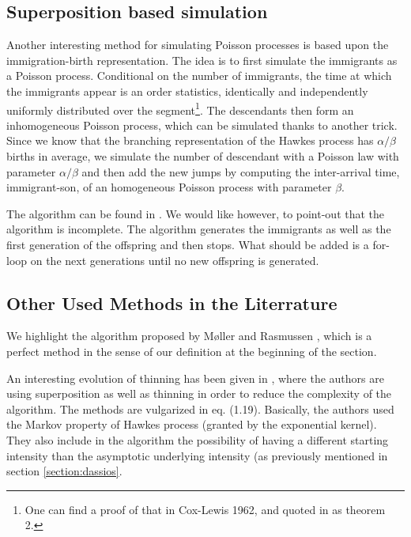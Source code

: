 \subsection{Superposition based simulation}
Another interesting method for simulating Poisson processes is based upon the immigration-birth representation. The idea is to first simulate the immigrants as a Poisson process. Conditional on the number of immigrants, the time at which the immigrants appear is an order statistics, identically and independently uniformly distributed over the segment\footnote{One can find a proof of that in Cox-Lewis 1962, and quoted in \cite{gen_nonhomo_poisson} as theorem 2.}. The descendants then form an inhomogeneous Poisson process, which can be simulated thanks to another trick. Since we know that the branching representation of the Hawkes process has $\alpha / \beta $ births in average, we simulate the number of descendant with a Poisson law with parameter $\alpha / \beta$ and then add the new jumps by computing the inter-arrival time, immigrant-son, of an homogeneous Poisson process with parameter $\beta$.

The algorithm can be found in \cite{simullaub}. We would like however, to point-out that the algorithm is incomplete. The algorithm generates the immigrants as well as the first generation of the offspring and then stops. What should be added is a for-loop on the next generations until no new offspring is generated.




\subsection{Other Used Methods in the Literrature}
We highlight the algorithm proposed by Møller and Rasmussen \cite{rasmussen}, which is a perfect method in the sense of our definition at the beginning of the section.

An interesting evolution of thinning has been given in \cite{simuldassios}, where the authors are using superposition as well as thinning in order to reduce the complexity of the algorithm. The methods are vulgarized in \cite{socialhawkes} eq. (1.19). Basically, the authors used the Markov property of Hawkes process (granted by the exponential kernel). They also include in the algorithm the possibility of having a different starting intensity than the asymptotic underlying intensity (as previously mentioned in section \ref{section:dassios}. 



